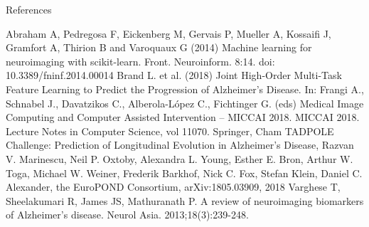 \documentclass[final]{beamer}
\newlength{\onecolwid}
\begin{document}
\begin{frame}[t]
\begin{columns}[t]
\begin{column}{\onecolwid}
        
        
        \begin{block}{References}
        
        {
            
            \scriptsize
            \vspace{0.1in}
            \linebreak
            \linebreak Abraham A, Pedregosa F, Eickenberg M, Gervais P, Mueller A, Kossaifi J, Gramfort A, Thirion B and Varoquaux G (2014) Machine learning for neuroimaging with scikit-learn. Front. Neuroinform. 8:14. doi: 10.3389/fninf.2014.00014
            \linebreak
            \linebreak Brand L. et al. (2018) Joint High-Order Multi-Task Feature Learning to Predict the Progression of Alzheimer’s Disease. In: Frangi A., Schnabel J., Davatzikos C., Alberola-López C., Fichtinger G. (eds) Medical Image Computing and Computer Assisted Intervention – MICCAI 2018. MICCAI 2018. Lecture Notes in Computer Science, vol 11070. Springer, Cham
            \linebreak
            \linebreak TADPOLE Challenge: Prediction of Longitudinal Evolution in Alzheimer's Disease, Razvan V. Marinescu, Neil P. Oxtoby, Alexandra L. Young, Esther E. Bron, Arthur W. Toga, Michael W. Weiner, Frederik Barkhof, Nick C. Fox, Stefan Klein, Daniel C. Alexander, the EuroPOND Consortium, arXiv:1805.03909, 2018
            \linebreak
            \linebreak Varghese T, Sheelakumari R, James JS, Mathuranath P. A review of neuroimaging biomarkers of Alzheimer's disease. Neurol Asia. 2013;18(3):239-248.
            
            
        }
        
        \end{block}
        
        

\end{column}
\end{columns}
\end{frame}
\end{document}
